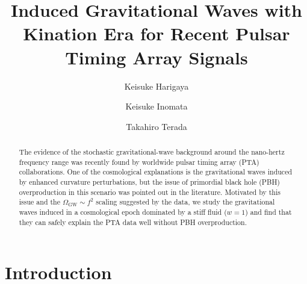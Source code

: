 \documentclass[superscriptaddress, aps, preprintnumbers,
amsmath, amssymb, sort&compress, nofootinbib, 10pt, paper, floatfix]{revtex4-2}
\begin{document}
\title{
Induced Gravitational Waves with Kination Era for Recent Pulsar Timing Array Signals
}

\author{Keisuke Harigaya}

\author{Keisuke Inomata}

\author{Takahiro Terada}


\begin{abstract}
\noindent
The evidence of the stochastic gravitational-wave background around the nano-hertz frequency range was recently found by worldwide pulsar timing array (PTA) collaborations. One of the cosmological explanations is the gravitational waves induced by enhanced curvature perturbations, but the issue of primordial black hole (PBH) overproduction in this scenario was pointed out in the literature. Motivated by this issue and the $\Omega_\text{GW} \sim f^2$ scaling suggested by the data, we study the gravitational waves induced in a cosmological epoch dominated by a stiff fluid ($w=1$) and find that they can safely explain the PTA data well without PBH overproduction. 
\end{abstract}

\maketitle


\section{Introduction} \label{sec:intro}
\end{document}
